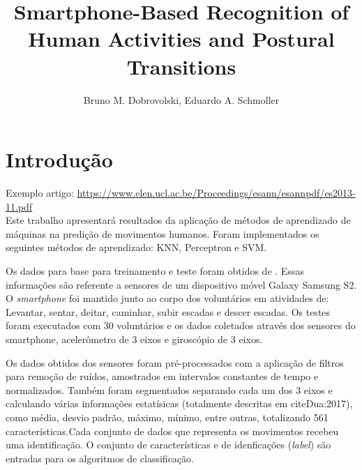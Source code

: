 \documentclass[12pt]{article}
\title{Smartphone-Based Recognition of Human Activities and Postural Transitions}
\author{Bruno M. Dobrovolski\inst{1}, Eduardo A. Schmoller\inst{1}}
\begin{document}
 

\maketitle

%

\section{Introdução}

	Exemplo artigo: \url{https://www.elen.ucl.ac.be/Proceedings/esann/esannpdf/es2013-11.pdf}\\

	Este trabalho apresentará resultados da aplicação de métodos de aprendizado de máquinas na predição de movimentos humanos. Foram implementados os seguintes métodos de aprendizado: KNN, Perceptron e SVM. 
	
	Os dados para base para treinamento e teste foram obtidos de \cite{Dua:2017}. Essas informações são referente a sensores de um dispositivo móvel Galaxy Samsung S2. O \textit{smartphone} foi mantido junto ao corpo dos voluntários em atividades de: Levantar, sentar, deitar, caminhar, subir escadas e descer escadas. Os testes foram executados com 30 voluntários e os dados coletados através dos sensores do smartphone, acelerômetro de 3 eixos e giroscópio de 3 eixos.
	
	Os dados obtidos dos sensores foram pré-processados com a aplicação de filtros para remoção de ruídos, amostrados em intervalos constantes de tempo e normalizados. Também foram segmentados separando cada um dos 3 eixos e calculando várias informações estatísicas (totalmente descritas em cite{Dua:2017}), como média, desvio padrão, máximo, mínimo, entre outras, totalizando 561 características.Cada conjunto de dados que representa os movimentos recebeu uma identificação. O conjunto de características e de idenficações (\emph{label}) são entradas para os algoritmos de classificação.
	
\end{document}
